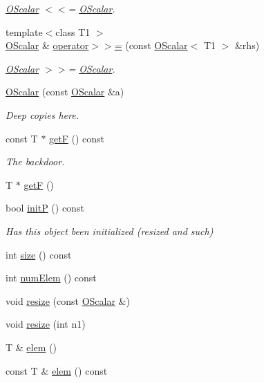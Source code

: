 \begin{DoxyCompactItemize}
\begin{DoxyCompactList}\small\item\em \mbox{\hyperlink{classENSEM_1_1OScalar}{O\+Scalar}} $<$$<$= \mbox{\hyperlink{classENSEM_1_1OScalar}{O\+Scalar}}. \end{DoxyCompactList}\item 
{\footnotesize template$<$class T1 $>$ }\\\mbox{\hyperlink{classENSEM_1_1OScalar}{O\+Scalar}} \& \mbox{\hyperlink{classENSEM_1_1OScalar_a38ab5a0779184c6ca5a1b3211e2e38ca}{operator$>$$>$=}} (const \mbox{\hyperlink{classENSEM_1_1OScalar}{O\+Scalar}}$<$ T1 $>$ \&rhs)
\begin{DoxyCompactList}\small\item\em \mbox{\hyperlink{classENSEM_1_1OScalar}{O\+Scalar}} $>$$>$= \mbox{\hyperlink{classENSEM_1_1OScalar}{O\+Scalar}}. \end{DoxyCompactList}\item 
\mbox{\hyperlink{classENSEM_1_1OScalar_a4e394f0291247b014b9b75354e79ae6a}{O\+Scalar}} (const \mbox{\hyperlink{classENSEM_1_1OScalar}{O\+Scalar}} \&a)
\begin{DoxyCompactList}\small\item\em Deep copies here. \end{DoxyCompactList}\item 
const T $\ast$ \mbox{\hyperlink{classENSEM_1_1OScalar_a8e87e97e45239d934b0d141dcf9b92d7}{getF}} () const
\begin{DoxyCompactList}\small\item\em The backdoor. \end{DoxyCompactList}\item 
T $\ast$ \mbox{\hyperlink{classENSEM_1_1OScalar_a040999918115f255a411fd96ad87663f}{getF}} ()
\item 
bool \mbox{\hyperlink{classENSEM_1_1OScalar_a2de94d9cb377fa4ca961d0a8906a76b6}{initP}} () const
\begin{DoxyCompactList}\small\item\em Has this object been initialized (resized and such) \end{DoxyCompactList}\item 
int \mbox{\hyperlink{classENSEM_1_1OScalar_a2029adc2feeab03e85a091ab6878fc2d}{size}} () const
\item 
int \mbox{\hyperlink{classENSEM_1_1OScalar_aa9a7a2cddc34ba1add28369a764ced80}{num\+Elem}} () const
\item 
void \mbox{\hyperlink{classENSEM_1_1OScalar_ab7d5b96a7f1a3451bedd04eda3169c84}{resize}} (const \mbox{\hyperlink{classENSEM_1_1OScalar}{O\+Scalar}} \&)
\item 
void \mbox{\hyperlink{classENSEM_1_1OScalar_ab8b1ad6566b12cb3036794b47bb0ae8d}{resize}} (int n1)
\item 
T \& \mbox{\hyperlink{classENSEM_1_1OScalar_af07cc94eb09bfc29991d8fdc30727574}{elem}} ()
\item 
const T \& \mbox{\hyperlink{classENSEM_1_1OScalar_af797ae7d3763acab7b024aa159b3a7b8}{elem}} () const
\end{DoxyCompactItemize}


